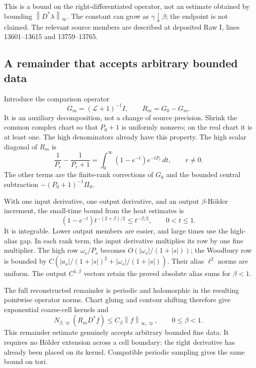 \documentclass[11pt]{article}
\newcommand{\norm}[1]{\left\lVert#1\right\rVert}
\begin{document}
This is a bound on the right-differentiated operator, not an estimate
obtained by bounding $\norm{D^*\lambda}_\infty$. The constant can
grow as $\gamma\downarrow\beta$; the endpoint is not claimed.
The relevant source members are described at deposited Raw I,
lines 13601--13615 and 13759--13765.

\subsection{A remainder that accepts arbitrary bounded data}

Introduce the comparison operator
\begin{equation}\label{rd-massive-split}
 G_m=(\mathcal L+1)^{-1}I,\qquad R_m=G_0-G_m.
\end{equation}
It is an auxiliary decomposition, not a change of source precision.
Shrink the common complex chart so that $P_0+1$ is uniformly nonzero;
on the real chart it is at least one. The high denominators already
have this property. The high scalar diagonal of $R_m$ is
\begin{equation}\label{rd-high-remainder}
 \frac1{P_r}-\frac1{P_r+1}
    =\int_0^\infty(1-e^{-t})e^{-tP_r}\,dt,
                    \qquad r\ne0.
\end{equation}
The other terms are the finite-rank corrections of $G_0$ and the
bounded central subtraction $-(P_0+1)^{-1}\Pi_0$.

With one input derivative, one output derivative, and an output
$\beta$-H\"older increment, the small-time bound from the heat
estimates is
\[
 (1-e^{-t})t^{-(2+\beta)/2}\le t^{-\beta/2},
                       \qquad0<t\le1.
\]
It is integrable. Lower output members are easier, and large times
use the high-alias gap. In each rank term, the input derivative
multiplies its row by one fine multiplier. The high row
$\omega_s/P_s$ becomes $O(|\omega_s|/(1+|s|))$; the Woodbury row
is bounded by
$C(|a_s|/(1+|s|)^2+|\omega_s|/(1+|s|))$.
Their alias $\ell^2$ norms are uniform. The output
$C^{1,\beta}$ vectors retain the proved absolute alias sums for
$\beta<1$.

The full reconstructed remainder is periodic and holomorphic in
the resulting pointwise operator norms. Chart gluing and contour
shifting therefore give exponential coarse-cell kernels and
\begin{equation}\label{rd-remainder-bound}
 N_{\beta,\varpi}(R_mD^*f)
                  \le C_\beta\norm{f}_{\infty,\varpi},
                       \qquad0\le\beta<1.
\end{equation}
This remainder estimate genuinely accepts arbitrary bounded fine
data. It requires no H\"older extension across a cell boundary:
the right derivative has already been placed on its kernel.
Compatible periodic sampling gives the same bound on tori.
\end{document}

